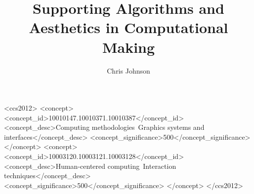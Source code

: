 \documentclass[manuscript,screen,review,anonymous=true]{acmart}
\begin{document}
\title{Supporting Algorithms and Aesthetics in Computational Making}

\author{Chris Johnson}

\renewcommand{\shortauthors}{Johnson}

\begin{abstract}

\end{abstract}

\begin{CCSXML}
<ccs2012>
   <concept>
       <concept_id>10010147.10010371.10010387</concept_id>
       <concept_desc>Computing methodologies~Graphics systems and interfaces</concept_desc>
       <concept_significance>500</concept_significance>
       </concept>
   <concept>
       <concept_id>10003120.10003121.10003128</concept_id>
       <concept_desc>Human-centered computing~Interaction techniques</concept_desc>
       <concept_significance>500</concept_significance>
       </concept>
 </ccs2012>
\end{CCSXML}



\maketitle









\end{document}
